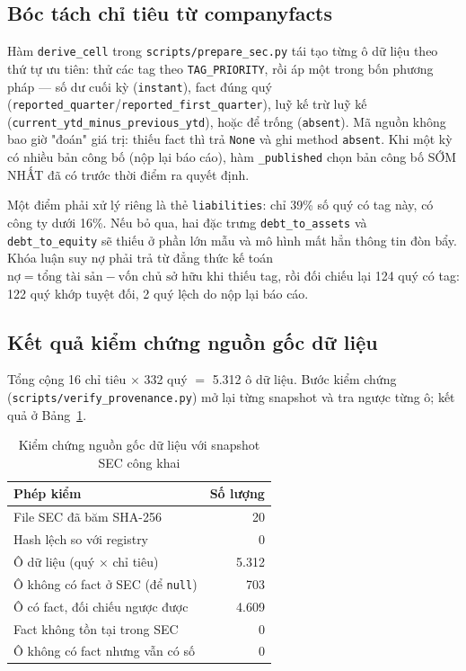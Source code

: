 \subsection{Bóc tách chỉ tiêu từ companyfacts}

Hàm \texttt{derive\_cell} trong \texttt{scripts/prepare\_sec.py} tái tạo từng ô dữ liệu theo thứ tự
ưu tiên: thử các tag theo \texttt{TAG\_PRIORITY}, rồi áp một trong bốn phương pháp — số dư cuối kỳ
(\texttt{instant}), fact đúng quý (\texttt{reported\_quarter}/\texttt{reported\_first\_quarter}),
luỹ kế trừ luỹ kế (\texttt{current\_ytd\_minus\_previous\_ytd}), hoặc để trống (\texttt{absent}). Mã
nguồn không bao giờ "đoán" giá trị: thiếu fact thì trả \texttt{None} và ghi method \texttt{absent}.
Khi một kỳ có nhiều bản công bố (nộp lại báo cáo), hàm \texttt{\_published} chọn bản công bố SỚM
NHẤT đã có trước thời điểm ra quyết định.

Một điểm phải xử lý riêng là thẻ \texttt{liabilities}: chỉ 39\% số quý có tag này, có công ty dưới
16\%. Nếu bỏ qua, hai đặc trưng \texttt{debt\_to\_assets} và \texttt{debt\_to\_equity} sẽ thiếu ở
phần lớn mẫu và mô hình mất hẳn thông tin đòn bẩy. Khóa luận suy nợ phải trả từ đẳng thức kế toán
$\text{nợ} = \text{tổng tài sản} - \text{vốn chủ sở hữu}$ khi thiếu tag, rồi đối chiếu lại 124 quý có
tag: 122 quý khớp tuyệt đối, 2 quý lệch do nộp lại báo cáo.

\subsection{Kết quả kiểm chứng nguồn gốc dữ liệu}

Tổng cộng 16 chỉ tiêu $\times$ 332 quý $=$ 5.312 ô dữ liệu. Bước kiểm chứng
(\texttt{scripts/verify\_provenance.py}) mở lại từng snapshot và tra ngược từng ô; kết quả ở
Bảng~\ref{tab:provenance}.

\begin{table}[H]
\centering
\caption{Kiểm chứng nguồn gốc dữ liệu với snapshot SEC công khai}
\label{tab:provenance}
\begin{tabular}{|l|r|}
\hline
\textbf{Phép kiểm} & \textbf{Số lượng} \\
\hline
File SEC đã băm SHA-256            & 20 \\
Hash lệch so với registry          & 0 \\
Ô dữ liệu (quý $\times$ chỉ tiêu)  & 5.312 \\
Ô không có fact ở SEC (để \texttt{null}) & 703 \\
Ô có fact, đối chiếu ngược được    & 4.609 \\
Fact không tồn tại trong SEC       & 0 \\
Ô không có fact nhưng vẫn có số    & 0 \\
\hline
\end{tabular}
\end{table}

